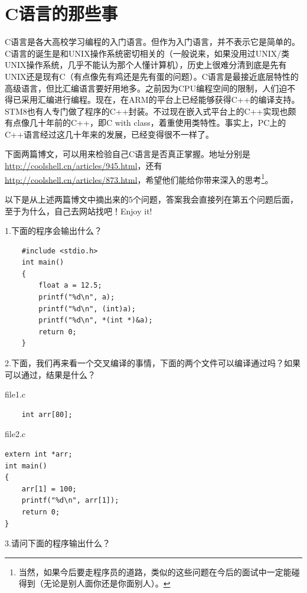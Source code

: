 \documentclass[a4paper]{book}
\begin{document}
\section{C语言的那些事}

C语言是各大高校学习编程的入门语言。但作为入门语言，并不表示它是简单的。C语言的诞生是和UNIX操作系统密切相关的（一般说来，如果没用过UNIX/类UNIX操作系统，几乎不能认为那个人懂计算机），历史上很难分清到底是先有UNIX还是现有C（有点像先有鸡还是先有蛋的问题）。C语言是最接近底层特性的高级语言，但比汇编语言要好用地多。之前因为CPU编程空间的限制，人们迫不得已采用汇编进行编程。现在，在ARM的平台上已经能够获得C++的编译支持。STM8也有人专门做了程序的C++封装。不过现在嵌入式平台上的C++实现也颇有点像几十年前的C++，即C with class，着重使用类特性。事实上，PC上的C++语言经过这几十年来的发展，已经变得很不一样了。

下面两篇博文，可以用来检验自己C语言是否真正掌握。地址分别是\url{http://coolshell.cn/articles/945.html}，还有\url{http://coolshell.cn/articles/873.html}，希望他们能给你带来深入的思考\footnote{当然，如果今后要走程序员的道路，类似的这些问题在今后的面试中一定能碰得到（无论是别人面你还是你面别人）。}。

以下是从上述两篇博文中摘出来的5个问题，答案我会直接列在第五个问题后面，至于为什么，自己去网站找吧！Enjoy it!

1.下面的程序会输出什么？

{\footnotesize\begin{shaded}\begin{verbatim}
    #include <stdio.h>
    int main() 
    {
        float a = 12.5;
        printf("%d\n", a); 
        printf("%d\n", (int)a); 
        printf("%d\n", *(int *)&a); 
        return 0; 
    }
\end{verbatim}\end{shaded}}
2.下面，我们再来看一个交叉编译的事情，下面的两个文件可以编译通过吗？如果可以通过，结果是什么？

file1.c

{\footnotesize\begin{shaded}\begin{verbatim}
    int arr[80]; 
\end{verbatim}\end{shaded}}
file2.c

{\footnotesize\begin{shaded}\begin{verbatim}
extern int *arr;
int main() 
{
    arr[1] = 100;
    printf("%d\n", arr[1]);
    return 0; 
} 
\end{verbatim}\end{shaded}}
3.请问下面的程序输出什么？
\end{document}
